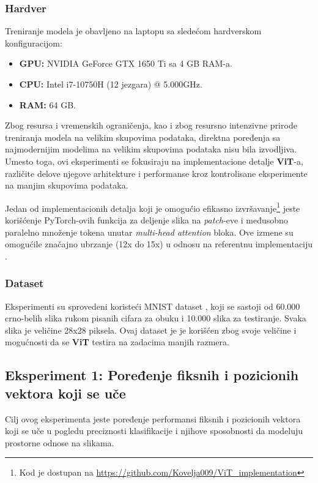 \documentclass[12pt]{article}
\begin{document}
   \newpage

   \subsubsection{Hardver}
   Treniranje modela je obavljeno na laptopu sa sledećom hardverskom konfiguracijom:
   \begin{itemize}
      \vspace{-0.5cm}
      \setlength\itemsep{0.2em} %
      \item \textbf{GPU:} NVIDIA GeForce GTX 1650 Ti sa 4 GB RAM-a.
      \item \textbf{CPU:} Intel i7-10750H (12 jezgara) @ 5.000GHz.
      \item \textbf{RAM:} 64 GB.
   \end{itemize}

   Zbog resursa i vremenskih ograničenja, kao i zbog resursno intenzivne prirode 
   treniranja modela na velikim skupovima podataka, direktna poređenja sa 
   najmodernijim modelima na velikim skupovima podataka nisu bila izvodljiva. Umesto 
   toga, ovi eksperimenti se fokusiraju na implementacione detalje \textbf{ViT}-a, 
   različite delove njegove arhitekture i performanse kroz kontrolisane 
   eksperimente na manjim skupovima podataka.

   Jedan od implementacionih detalja koji je omogućio efikasno izvršavanje\footnote{Kod je dostupan na \url{https://github.com/Kovelja009/ViT_implementation}}
   jeste korišćenje PyTorch-ovih funkcija za 
   deljenje slika na \textit{patch}-eve i međusobno paralelno množenje 
   tokena unutar \textit{multi-head attention} bloka. Ove izmene su omogućile značajno 
   ubrzanje (12x do 15x) u odnosu na referentnu implementaciju \cite{vit_impl}.

   \subsubsection{Dataset}
   Eksperimenti su sprovedeni koristeći MNIST dataset \cite{mnist}, 
   koji se sastoji od 60.000 crno-belih slika rukom pisanih cifara za obuku i 
   10.000 slika za testiranje. Svaka slika je veličine 28x28 piksela. Ovaj dataset je 
   je korišćen zbog svoje veličine i mogućnosti da se \textbf{ViT} testira na 
   zadacima manjih razmera.

   \subsection{Eksperiment 1: Poređenje fiksnih i pozicionih vektora koji se uče}
   Cilj ovog eksperimenta jeste poređenje performansi fiksnih 
   i pozicionih vektora koji se uče u pogledu preciznosti klasifikacije i 
   njihove sposobnosti da modeluju prostorne odnose na slikama.
\end{document}
